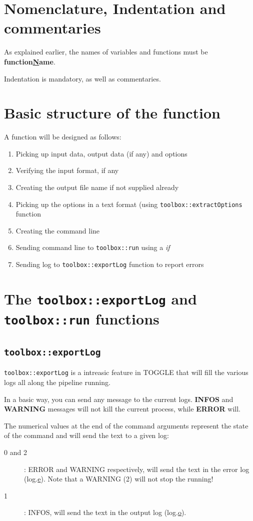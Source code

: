 \documentclass[a4paper,10pt]{report}
\begin{document}
\section{Nomenclature, Indentation and commentaries}

As explained earlier, the names of variables and functions must be \textbf{function\underline{N}ame}.

Indentation is mandatory, as well as commentaries.

\section{Basic structure of the function}

A function will be designed as follows:
\begin{enumerate}
 \item Picking up input data, output data (if any) and options
 \item Verifying the input format, if any
 \item Creating the output file name if not supplied already
 \item Picking up the options in a text format (using \texttt{toolbox::extractOptions} function
 \item Creating the command line
 \item Sending command line to \texttt{toolbox::run} using a \textit{if}
 \item Sending log to \texttt{toolbox::exportLog} function to report errors
\end{enumerate}

\section{The \texttt{toolbox::exportLog} and \texttt{toolbox::run} functions}

\subsection{\texttt{toolbox::exportLog}}

\texttt{toolbox::exportLog} is a intreasic feature in TOGGLE that will fill the various logs all along the pipeline running.

In a basic way, you can send any message to the current logs. \textbf{INFOS} and \textbf{WARNING} messages will not kill the current process, while \textbf{ERROR} will.

The numerical values at the end of the command arguments represent the state of the command and will send the text to a given log:
\begin{description}
 \item [0 and 2]: ERROR and WARNING respectively, will send the text in the error log (log.\underline{e}). Note that a WARNING (2) will not stop the running!
 \item [1]: INFOS, will send the text in the output log (log.\underline{o}).
\end{description}
\end{document}
